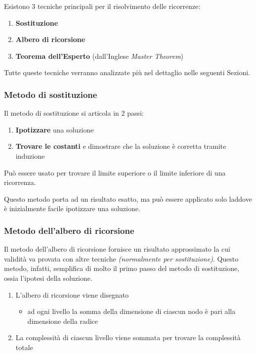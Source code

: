 \documentclass[italian, 10pt]{article}
\begin{document}
Esistono \(3\) tecniche principali per il risolvimento delle ricorrenze:

\begin{enumerate}
  \item \textbf{Sostituzione}
  \item \textbf{Albero di ricorsione}
  \item \textbf{Teorema dell'Esperto} (dall'Inglese \textit{Master Theorem})
\end{enumerate}

Tutte queste tecniche verranno analizzate più nel dettaglio nelle seguenti Sezioni.

\subsubsection{Metodo di sostituzione}

Il metodo di sostituzione si articola in \(2\) passi:

\begin{enumerate}
  \item \textbf{Ipotizzare} una soluzione
  \item \textbf{Trovare le costanti} e dimostrare che la soluzione è corretta tramite induzione
\end{enumerate}

Può essere usato per trovare il limite superiore o il limite inferiore di una ricorrenza.

Questo metodo porta ad un risultato esatto, ma può essere applicato solo laddove è inizialmente facile ipotizzare una soluzione.

\subsubsection{Metodo dell'albero di ricorsione}

Il metodo dell'albero di ricorsione fornisce un risultato approssimato la cui validità va provata con altre tecniche \textit{(normalmente per sostituzione)}.
Questo metodo, infatti, semplifica di molto il primo passo del metodo di sostituzione, ossia l'ipotesi della soluzione.

\begin{enumerate}
  \item L'albero di ricorsione viene disegnato
        \begin{itemize}[label=\(\rightarrow\)]
          \item ad ogni livello la somma della dimensione di ciascun nodo è pari alla dimensione della radice
        \end{itemize}
  \item La complessità di ciascun livello viene sommata per trovare la complessità totale
\end{enumerate}
\end{document}
